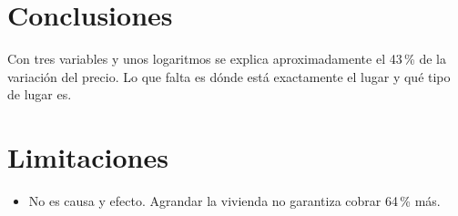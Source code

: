 \documentclass{llncs}
\begin{document}
\section*{Conclusiones}

Con tres variables y unos logaritmos se explica aproximadamente el
43\,\% de la variación del precio. Lo que falta es dónde está
exactamente el lugar y qué tipo de lugar es.

\section*{Limitaciones}

\begin{itemize}
\item No es causa y efecto. Agrandar la vivienda no garantiza cobrar
64\,\% más.
\end{itemize}
\end{document}
